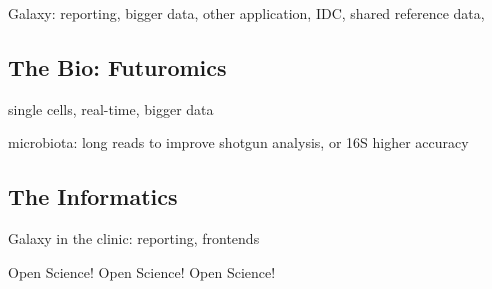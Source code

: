 Galaxy: reporting, bigger data, other application, IDC, shared reference data,

\subsection{The Bio: Futuromics}
single cells, real-time, bigger data

microbiota: long reads to improve shotgun analysis, or 16S higher accuracy

\subsection{The Informatics}

Galaxy in the clinic: reporting, frontends

Open Science! Open Science! Open Science!



